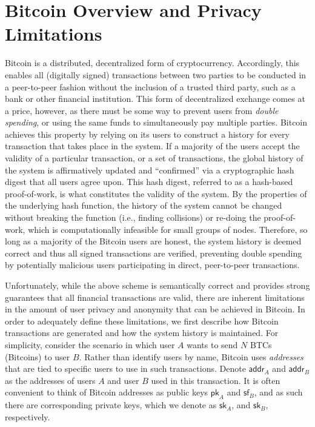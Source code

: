 \section{Bitcoin Overview and Privacy Limitations}

Bitcoin is a distributed, decentralized form of cryptocurrency. Accordingly, this enables all (digitally signed)  transactions between two parties to be conducted in a peer-to-peer fashion without the inclusion of a trusted third party, such as a bank or other financial institution. This form of decentralized exchange comes at a price, however, as there must be some way to prevent users from \emph{double spending}, or using the same funds to simultaneously pay multiple parties. Bitcoin achieves this property by relying on its users to construct a history for every transaction that takes place in the system. If a majority of the users accept the validity of a particular transaction, or a set of transactions, the global history of the system is affirmatively updated and ``confirmed'' via a cryptographic hash digest that all users agree upon. This hash digest, referred to as a hash-based proof-of-work, is what constitutes the validity of the system. By the properties of the underlying hash function, the history of the system cannot be changed without breaking the function (i.e., finding collisions) or re-doing the proof-of-work, which is computationally infeasible for small groups of nodes. Therefore, so long as a majority of the Bitcoin users are honest, the system history is deemed correct and thus all signed transactions are verified, preventing double spending by potentially malicious users participating in direct, peer-to-peer transactions. 

Unfortunately, while the above scheme is semantically correct and provides strong guarantees that all financial transactions are valid, there are inherent limitations in the amount of user privacy and anonymity that can be achieved in Bitcoin. In order to adequately define these limitations, we first describe how Bitcoin transactions are generated and how the system history is maintained. For simplicity, consider the scenario in which user $A$ wants to send $N$ BTCs (Bitcoins) to user $B$. Rather than identify users by name, Bitcoin uses \emph{addresses} that are tied to specific users to use in such transactions. Denote $\mathsf{addr}_A$ and $\mathsf{addr}_B$ as the addresses of users $A$ and user $B$ used in this transaction. It is often convenient to think of Bitcoin addresses as public keys $\mathsf{pk}_A$ and $\mathsf{sf}_B$, and as such there are corresponding private keys, which we denote as $\mathsf{sk}_A$, and $\mathsf{sk}_B$, respectively.

